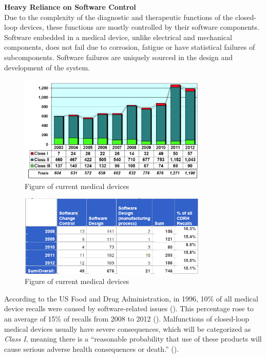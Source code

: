 \textbf{Heavy Reliance on Software Control}\\
Due to the complexity of the diagnostic and therapeutic functions of the closed-loop devices, these functions are mostly controlled by their software components. 
Software embedded in a medical device, unlike electrical and mechanical components, does not fail due to corrosion, fatigue or have statistical failures of subcomponents. Software failures are uniquely sourced in the design and development of the system. %
\begin{figure}[t]
		\centering
		\includegraphics[width=0.8\textwidth]{figs/recalls.jpg}
		\caption{\small Figure of current medical devices}
		\label{fig:recalls}
\end{figure}
\begin{figure}[t]
		\centering
		\includegraphics[width=0.8\textwidth]{figs/soft_recalls.jpg}
		\caption{\small Figure of current medical devices}
		\label{fig:soft_recalls}
\end{figure}
According to the US Food and Drug Administration, in 1996, 10\% of all medical device recalls were caused by software-related issues (\cite{medstats}). This percentage rose to an average of 15\% of recalls from 2008 to 2012 (). Malfunctions of closed-loop medical devices usually have severe consequences, which will be categorized as \emph{Class I}, meaning there is a ``reasonable probability that use of these products will cause serious adverse health consequences or death.'' (\cite{medstats2,pacemakerrecalls,killedbycode}). 
	
